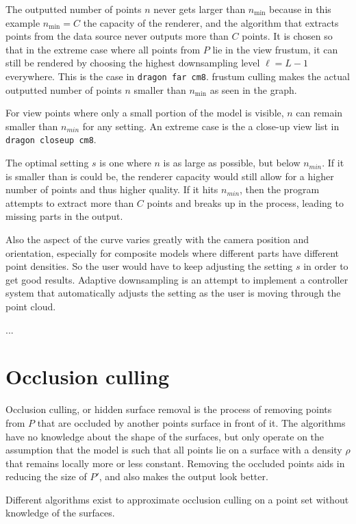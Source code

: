 \documentclass[a4paper,10pt,abstracton,notitlepage]{scrreprt}
\begin{document}
The outputted number of points $n$ never gets larger than $n_{\min}$ because in this example $n_{\min} = C$ the capacity of the renderer, and the algorithm that extracts points from the data source never outputs more than $C$ points. It is chosen so that in the extreme case where all points from $P$ lie in the view frustum, it can still be rendered by choosing the highest downsampling level $\ell = L-1$ everywhere. This is the case in \texttt{dragon far cm8}. frustum culling makes the actual outputted number of points $n$ smaller than $n_{\min}$ as seen in the graph.

For view points where only a small portion of the model is visible, $n$ can remain smaller than $n_{min}$ for any setting. An extreme case is the a close-up view list in \texttt{dragon closeup cm8}.

The optimal setting $s$ is one where $n$ is as large as possible, but below $n_{min}$. If it is smaller than is could be, the renderer capacity would still allow for a higher number of points and thus higher quality. If it hits $n_{min}$, then the program attempts to extract more than $C$ points and breaks up in the process, leading to missing parts in the output.

Also the aspect of the curve varies greatly with the camera position and orientation, especially for composite models where different parts have different point densities. So the user would have to keep adjusting the setting $s$ in order to get good results. Adaptive downsampling is an attempt to implement a controller system that automatically adjusts the setting as the user is moving through the point cloud.

...


\section{Occlusion culling}
Occlusion culling, or hidden surface removal is the process of removing points from $P$ that are occluded by another points surface in front of it. The algorithms have no knowledge about the shape of the surfaces, but only operate on the assumption that the model is such that all points lie on a surface with a density $\rho$ that remains locally more or less constant. Removing the occluded points aids in reducing the size of $P'$, and also makes the output look better.

Different algorithms exist to approximate occlusion culling on a point set without knowledge of the surfaces.
\end{document}
